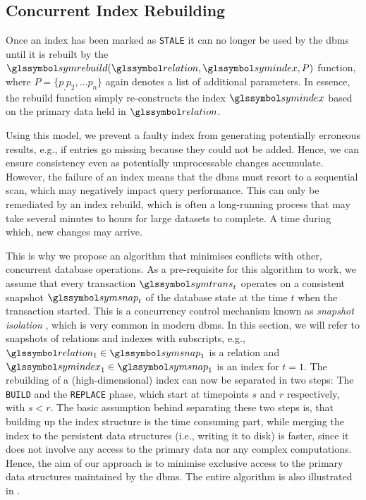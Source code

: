 \subsection{Concurrent Index Rebuilding}

Once an index has been marked as \texttt{STALE} it can no longer be used by the \acrshort{dbms} until it is rebuilt by the $\symrebuild(\relation,\symindex,P)$ function, where $P = \{ p_, p_2, \ldots p_n \}$ again denotes a list of additional parameters. In essence, the rebuild function simply re-constructs the index $\symindex$ based on the primary data held in $\relation$.

Using this model, we prevent a faulty index from generating potentially erroneous results, e.g., if entries go missing because they could not be added. Hence, we can ensure consistency even as potentially unprocessable changes accumulate. However, the failure of an index means that the \acrshort{dbms} must resort to a sequential scan, which may negatively impact query performance. This can only be remediated by an index rebuild, which is often a long-running process that may take several minutes to hours for large datasets to complete. A time during which, new changes may arrive.

This is why we propose an algorithm that minimises conflicts with other, concurrent database operations. As a pre-requisite for this algorithm to work, we assume that every transaction $\symtrans_t$ operates on a consistent snapshot $\symsnap_t$ of the database state at the time $t$ when the transaction started. This is a concurrency control mechanism known as \emph{snapshot isolation} \cite{Berenson:1995Critique}, which is very common in modern \acrshort{dbms}. In this section, we will refer to snapshots of relations and indexes with subscripts, e.g.,  $\relation_{1} \in \symsnap_1$ is a relation and $\symindex_{1} \in \symsnap_1$ is an index for $t=1$. The rebuilding of a (high-dimensional) index can now be separated in two steps: The \texttt{BUILD} and the \texttt{REPLACE} phase, which start at timepoints $s$ and $r$ respectively, with $s < r$. The basic assumption behind separating these two steps is, that building up the index structure is the time consuming part, while merging the index to the persistent data structures (i.e., writing it to disk) is faster, since it does not involve any access to the primary data nor any complex computations. Hence, the aim of our approach is to minimise exclusive access to the primary data structures maintained by the \acrshort{dbms}. The entire algorithm is also illustrated in .

